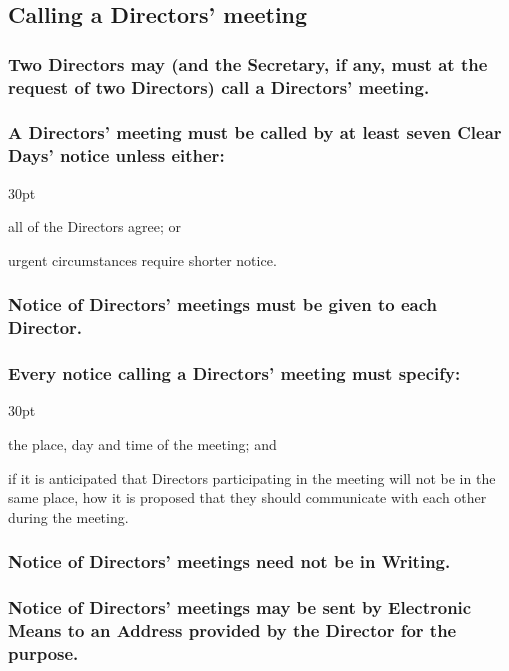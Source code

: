 \documentclass[12pt]{article}
\def\clauseindent{30pt}
\newenvironment{subindentpara}{\begin{adjustwidth}{\clauseindent}{}\begin{hanginglist}}{\end{hanginglist}\end{adjustwidth}}
\begin{document}
\subsection{Calling a Directors' meeting}
\subsubsection[Directors may call a Directors' meeting]{Two Directors may (and the Secretary, if any, must at the request of two Directors) call a Directors' meeting.}
\subsubsection{A Directors' meeting must be called by at least seven Clear Days' notice unless either:}
\begin{subindentpara}
  \item all of the Directors agree; or
  \item urgent circumstances require shorter notice.
\end{subindentpara}
\subsubsection{Notice of Directors' meetings must be given to each Director.}
\subsubsection[Specifics of notices calling a Directors' meeting]{Every notice calling a Directors' meeting must specify:}
\begin{subindentpara}
  \item the place, day and time of the meeting; and
  \item if it is anticipated that Directors participating in the meeting will not be in the same place, how it is proposed that they should communicate with each other during the meeting.
\end{subindentpara}
\subsubsection{Notice of Directors' meetings need not be in Writing.}
\subsubsection[Notice of Directors' meetings by Electronic Means]{Notice of Directors' meetings may be sent by Electronic Means to an Address provided by the Director for the purpose.}
\end{document}

